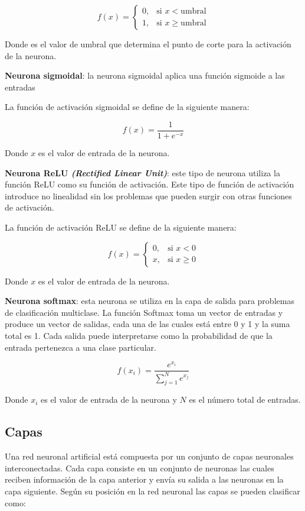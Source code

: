 \[
f(x) = \begin{cases}
    0, & \text{si } x < \text{umbral} \\
    1, & \text{si } x \geq \text{umbral}
\end{cases}
\]

Donde  es el valor de umbral que determina el punto de corte para la activación de la neurona.

\textbf{Neurona sigmoidal}: la neurona sigmoidal aplica una función sigmoide a las entradas

La función de activación sigmoidal se define de la siguiente manera:

\[
f(x) = \frac{1}{1 + e^{-x}}
\]

Donde $x$ es el valor de entrada de la neurona.

\textbf{Neurona ReLU \textit{(Rectified Linear Unit)}}: este tipo de neurona utiliza la función ReLU como su función de activación.
Este tipo de función de activación introduce no linealidad sin los problemas que pueden surgir con otras funciones de activación.

La función de activación ReLU se define de la siguiente manera:

\[
f(x) = \begin{cases}
    0, & \text{si } x < 0 \\
    x, & \text{si } x \geq 0
\end{cases}
\]

Donde $x$ es el valor de entrada de la neurona.

\textbf{Neurona softmax}: esta neurona se utiliza en la capa de salida para problemas de clasificación multiclase. La función Softmax toma un vector de entradas y produce un vector de salidas, cada una de las cuales está entre 0 y 1 y la suma total es 1. 
Cada salida puede interpretarse como la probabilidad de que la entrada pertenezca a una clase particular.

\[
f(x_i) = \frac{e^{x_i}}{\sum_{j=1}^{N} e^{x_j}}
\]

Donde $x_i$ es el valor de entrada de la neurona y $N$ es el número total de entradas.

\subsection{Capas}
Una red neuronal artificial está compuesta por un conjunto de capas neuronales interconectadas. \cite{AGGARWAL_2023} \cite{Ognjanovski_2020}
Cada capa consiste en un conjunto de neuronas las cuales reciben información de la capa anterior y envía su salida a las neuronas en la capa siguiente. Según su posición en la red neuronal las capas se pueden clasificar como:

